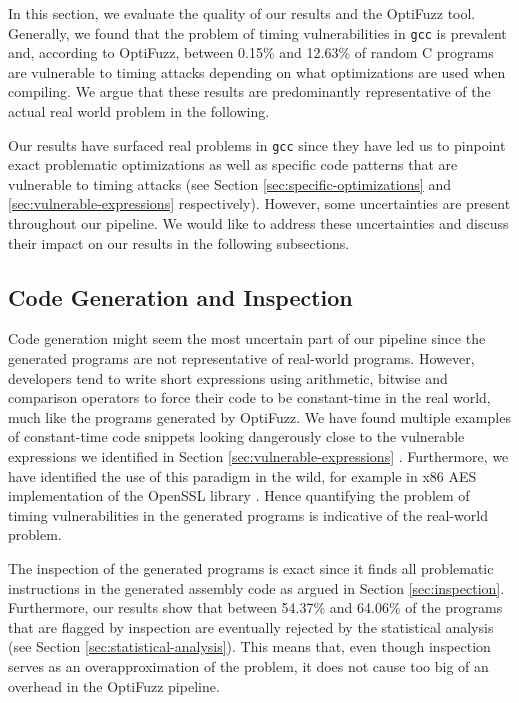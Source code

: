 In this section, we evaluate the quality of our results and the OptiFuzz tool.
Generally, we found that the problem of timing vulnerabilities in \texttt{gcc} is prevalent and, according to OptiFuzz, between 0.15\% and 12.63\% of random C programs are vulnerable to timing attacks depending on what optimizations are used when compiling. 
We argue that these results are predominantly representative of the actual real world problem in the following.

Our results have surfaced real problems in \texttt{gcc} since they have led us to pinpoint exact problematic optimizations as well as specific code patterns that are vulnerable to timing attacks (see Section \ref{sec:specific-optimizations} and \ref{sec:vulnerable-expressions} respectively).
However, some uncertainties are present throughout our pipeline.
We would like to address these uncertainties and discuss their impact on our results in the following subsections.

\subsection{Code Generation and Inspection}
Code generation might seem the most uncertain part of our pipeline since the generated programs are not representative of real-world programs.
However, developers tend to write short expressions using arithmetic, bitwise and comparison operators to force their code to be constant-time in the real world, much like the programs generated by OptiFuzz. 
We have found multiple examples of constant-time code snippets looking dangerously close to the vulnerable expressions we identified in Section \ref{sec:vulnerable-expressions} \citep{fact,what-you-c}.
Furthermore, we have identified the use of this paradigm in the wild, for example in x86 AES implementation of the OpenSSL library \citep{openssl}.
Hence quantifying the problem of timing vulnerabilities in the generated programs is indicative of the real-world problem.

The inspection of the generated programs is exact since it finds all problematic instructions in the generated assembly code as argued in Section \ref{sec:inspection}.
Furthermore, our results show that between 54.37\% and 64.06\% of the programs that are flagged by inspection are eventually rejected by the statistical analysis (see Section \ref{sec:statistical-analysis}). 
This means that, even though inspection serves as an overapproximation of the problem, it does not cause too big of an overhead in the OptiFuzz pipeline.

